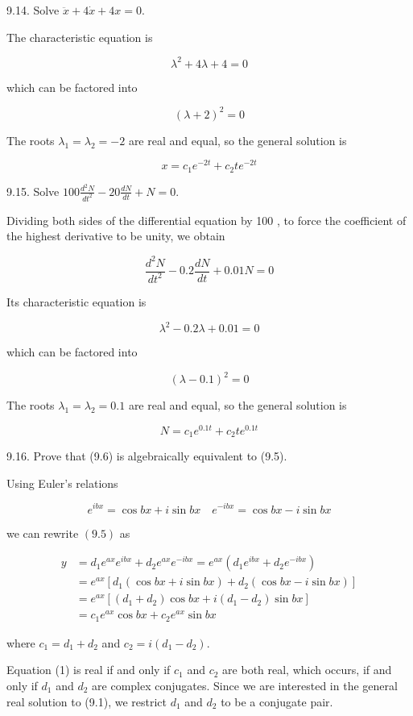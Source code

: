 \documentclass[10pt]{article}
\begin{document}
9.14. Solve $\ddot{x}+4 \dot{x}+4 x=0$.

The characteristic equation is

$$
\lambda^{2}+4 \lambda+4=0
$$

which can be factored into

$$
(\lambda+2)^{2}=0
$$

The roots $\lambda_{1}=\lambda_{2}=-2$ are real and equal, so the general solution is

$$
x=c_{1} e^{-2 t}+c_{2} t e^{-2 t}
$$

9.15. Solve $100 \frac{d^{2} N}{d t^{2}}-20 \frac{d N}{d t}+N=0$.

Dividing both sides of the differential equation by 100 , to force the coefficient of the highest derivative to be unity, we obtain

$$
\frac{d^{2} N}{d t^{2}}-0.2 \frac{d N}{d t}+0.01 N=0
$$

Its characteristic equation is

$$
\lambda^{2}-0.2 \lambda+0.01=0
$$

which can be factored into

$$
(\lambda-0.1)^{2}=0
$$

The roots $\lambda_{1}=\lambda_{2}=0.1$ are real and equal, so the general solution is

$$
N=c_{1} e^{0.1 t}+c_{2} t e^{0.1 t}
$$

9.16. Prove that (9.6) is algebraically equivalent to (9.5).

Using Euler's relations

$$
e^{i b x}=\cos b x+i \sin b x \quad e^{-i b x}=\cos b x-i \sin b x
$$

we can rewrite $(9.5)$ as


\begin{align*}
y & =d_{1} e^{a x} e^{i b x}+d_{2} e^{a x} e^{-i b x}=e^{a x}\left(d_{1} e^{i b x}+d_{2} e^{-i b x}\right) \\
& =e^{a x}\left[d_{1}(\cos b x+i \sin b x)+d_{2}(\cos b x-i \sin b x)\right] \\
& =e^{a x}\left[\left(d_{1}+d_{2}\right) \cos b x+i\left(d_{1}-d_{2}\right) \sin b x\right] \\
& =c_{1} e^{a x} \cos b x+c_{2} e^{a x} \sin b x \tag{1}
\end{align*}


where $c_{1}=d_{1}+d_{2}$ and $c_{2}=i\left(d_{1}-d_{2}\right)$.

Equation (1) is real if and only if $c_{1}$ and $c_{2}$ are both real, which occurs, if and only if $d_{1}$ and $d_{2}$ are complex conjugates. Since we are interested in the general real solution to (9.1), we restrict $d_{1}$ and $d_{2}$ to be a conjugate pair.
\end{document}
